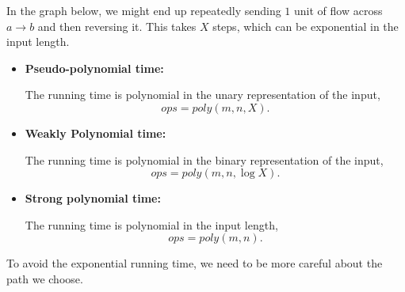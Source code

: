 \begin{example}
    In the graph below, we might end up repeatedly sending $1$ unit of flow across $a \to b$ and then reversing it. This takes $X$ steps, which can be exponential in the input length. 

    \begin{center}
    \end{center}
\end{example}

\begin{remark}
    \begin{itemize}
        \item \textbf{Pseudo-polynomial time:} 
        
        The running time is polynomial in the unary representation of the input, \[
            ops = poly(m, n, X).
        \]

        \item \textbf{Weakly Polynomial time:} 
        
        The running time is polynomial in the binary representation of the input, \[
            ops = poly(m, n, \log X).
        \]

        \item \textbf{Strong polynomial time:} 
        
        The running time is polynomial in the input length, \[
            ops = poly(m, n).
        \]
    \end{itemize}
\end{remark}

To avoid the exponential running time, we need to be more careful about the path we choose. 

